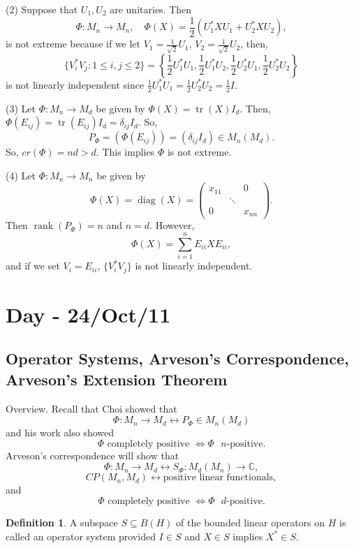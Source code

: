 \documentclass[12pt]{article}
\theoremstyle{definition}
\newtheorem*{definition}{Definition}
\DeclareMathOperator{\tr}{tr}
\newcommand{\C}{\mathbb{C}}
\begin{document}
(2) Suppose that $U_1,U_2$ are unitaries. Then
\[
\Phi : M_n \to M_n, \quad \Phi(X)=\frac{1}{2}(U_1^*XU_1 + U_2^*XU_2),
\]
is not extreme because if we let $V_1=\frac{1}{\sqrt{2}}U_1$, $V_2=\frac{1}{\sqrt{2}}U_2$, then,
\[
\{V_i^*V_j : 1 \leq i,j \leq 2\} = \left\{\frac{1}{2}U_1^*U_1, \frac{1}{2}U_1^*U_2, \frac{1}{2}U_2^*U_1, \frac{1}{2}U_2^*U_2\right\}
\]
is not linearly independent since $\frac{1}{2}U_1^*U_1 = \frac{1}{2}U_2^*U_2 = \frac{1}{2}I$.

(3) Let $\Phi : M_n \to M_d$ be given by $\Phi(X)=\tr(X)I_d$. Then, $\Phi(E_{ij})=\tr(E_{ij})I_d = \delta_{ij}I_d$. So,
\[
P_\Phi = (\Phi(E_{ij})) = (\delta_{ij}I_d) \in M_n(M_d).
\]
So, $cr(\Phi)=nd>d$. This implies $\Phi$ is not extreme.

(4) Let $\Phi : M_n \to M_n$ be given by
\[
\Phi(X)=\operatorname{diag}(X)=\begin{pmatrix}x_{11} & & 0\\ & \ddots & \\ 0 & & x_{nn}\end{pmatrix}.
\]
Then $\operatorname{rank}(P_\Phi)=n$ and $n=d$. However,
\[
\Phi(X)=\sum_{i=1}^n E_{ii}XE_{ii},
\]
and if we set $V_i = E_{ii}$, $\{V_i^*V_j\}$ is not linearly independent.

\section{Day - 24/Oct/11}

\subsection{Operator Systems, Arveson's Correspondence, Arveson's Extension Theorem}

Overview. Recall that Choi showed that
\[
\Phi : M_n \to M_d \leftrightarrow P_\Phi \in M_n(M_d)
\]
and his work also showed
\[
\Phi \text{ completely positive } \Leftrightarrow \Phi \text{ $n$-positive}.
\]
Arveson's correspondence will show that
\[
\Phi : M_n \to M_d \leftrightarrow S_\Phi : M_d(M_n) \to \C,
\]
\[
CP(M_n,M_d) \leftrightarrow \text{positive linear functionals},
\]
and
\[
\Phi \text{ completely positive } \Leftrightarrow \Phi \text{ $d$-positive}.
\]

\begin{definition}
A subspace $S \subseteq B(H)$ of the bounded linear operators on $H$ is called an operator system provided $I \in S$ and $X \in S$ implies $X^* \in S$.
\end{definition}
\end{document}
